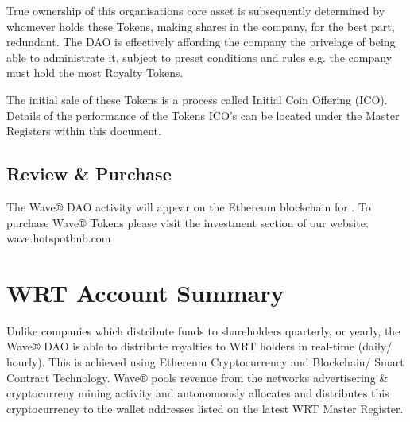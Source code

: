 \documentclass[letterpaper,10pt,openany,oneside,english]{sphinxmanual}
\begin{document}
True ownership of this organisations core asset is subsequently determined by whomever holds these Tokens, making shares in the company, for the best part, redundant.
The DAO is effectively affording the company the privelage of being able to administrate it, subject to preset conditions and rules e.g. the company must hold the most Royalty Tokens.

The initial sale of these Tokens is a process called Initial Coin Offering (ICO).
Details of the performance of the Tokens ICO’s can be located under the Master Registers within this document.


\section{Review \& Purchase}
\label{\detokenize{introduction:review-purchase}}
The Wave® DAO activity will appear on the Ethereum blockchain for .
To purchase Wave® Tokens please visit the investment section of our website: wave.hotspotbnb.com


\chapter{WRT Account Summary}
\label{\detokenize{wrt-summary:wrt-account-summary}}\label{\detokenize{wrt-summary::doc}}
Unlike companies which distribute funds to shareholders quarterly, or yearly, the Wave® DAO is able to distribute royalties to WRT holders in real-time (daily/ hourly). This is achieved using Ethereum Cryptocurrency and Blockchain/ Smart Contract Technology. Wave® pools revenue from the networks advertisering \& cryptocurreny mining activity and autonomously allocates and distributes this cryptocurrency to the wallet addresses listed on the latest WRT Master Register.
\end{document}
